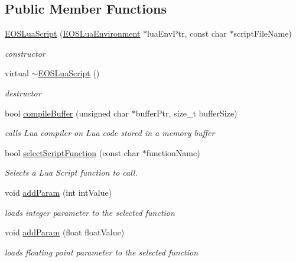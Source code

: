 \subsection*{Public Member Functions}
\begin{CompactItemize}
\item 
\hyperlink{classEOSLuaScript_4983ae13c09b63b607885c0770655362}{EOSLuaScript} (\hyperlink{classEOSLuaEnvironment}{EOSLuaEnvironment} $\ast$luaEnvPtr, const char $\ast$scriptFileName)
\begin{CompactList}\small\item\em constructor \item\end{CompactList}\item 
virtual \hyperlink{classEOSLuaScript_0967a55fb7371b9e5808822ba184996b}{$\sim$EOSLuaScript} ()
\begin{CompactList}\small\item\em destructor \item\end{CompactList}\item 
bool \hyperlink{classEOSLuaScript_c1d576d2d3ffa64a9437a062f325a813}{compileBuffer} (unsigned char $\ast$bufferPtr, size\_\-t bufferSize)
\begin{CompactList}\small\item\em calls Lua compiler on Lua code stored in a memory buffer \item\end{CompactList}\item 
bool \hyperlink{classEOSLuaScript_7f00ff555be32da27000d51bc7ba420f}{selectScriptFunction} (const char $\ast$functionName)
\begin{CompactList}\small\item\em Selects a Lua Script function to call. \item\end{CompactList}\item 
void \hyperlink{classEOSLuaScript_a939a1d1daa1326a012e5e60e1b45f95}{addParam} (int intValue)
\begin{CompactList}\small\item\em loads integer parameter to the selected function \item\end{CompactList}\item 
void \hyperlink{classEOSLuaScript_1a6ac1c2783c000b1cf57b3a09c04cfc}{addParam} (float floatValue)
\begin{CompactList}\small\item\em loads floating point parameter to the selected function \item\end{CompactList}\item 

\end{CompactItemize}
